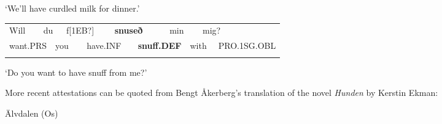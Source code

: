 
\begin{styleTranslation}
‘We’ll have curdled milk for dinner.’

\end{styleTranslation}


\begin{tabular}{llllllllllll}
\lsptoprule
Will & \multicolumn{2}{l}{du

} & \multicolumn{2}{l}{f[1EB?]

} & \multicolumn{2}{l}{{\bfseries snuseð}

} & \multicolumn{2}{l}{min

} & \multicolumn{2}{l}{mig?

} & \\
\multicolumn{2}{l}{want.PRS

} & \multicolumn{2}{l}{you

} & \multicolumn{2}{l}{have.INF

} & \multicolumn{2}{l}{{\bfseries snuff.DEF}

} & \multicolumn{2}{l}{with

} & \multicolumn{2}{l}{PRO.1SG.OBL

}\\
\lspbottomrule
\end{tabular}

\begin{styleTranslation}
 ‘Do you want to have snuff from me?’

\end{styleTranslation}

\begin{styleBodyTextFirst}
More recent attestations can be quoted from Bengt Åkerberg’s translation of the novel \textit{Hunden} by Kerstin Ekman:

\end{styleBodyTextFirst}


\begin{listWWNumileveli}
\item 

\begin{styleExample}
\label{bkm:Ref113183734}Älvdalen (Os) 

\end{styleExample}

\end{listWWNumileveli}

